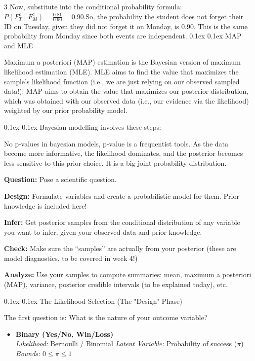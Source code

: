 \documentclass[8pt,landscape]{article}
\makeatletter
\renewcommand{\section}{\@startsection{section}{2}{0pt}%
    {0.1ex}%
    {0.1ex}%
    {\fontsize{8}{9}\bfseries\color{red}}} %
\renewcommand{\subsection}{\@startsection{subsection}{2}{0pt}%
    {0.1ex}%
    {0.1ex}%
    {\fontsize{8}{9}\bfseries\color{blue}}} %
\newcommand{\smalltext}[1]{
  {\fontsize{8}{9}\selectfont\sloppy #1\par}
}
\makeatother
\begin{document}
\begin{multicols}{3}
{  Now, substitute into the conditional probability formula:$P(F_T^c \mid F_M^c) = \frac{0.81}{0.90} = 0.90.$So, the probability the student does not forget their ID on Tuesday, given they did not forget it on Monday, is $0.90$. This is the same probability from Monday since both events are independent.
}
\subsection{MAP and MLE}
\smalltext{
  Maximum a posteriori (MAP) estimation is the Bayesian version of maximum likelihood estimation (MLE).
  MLE aims to find the value that maximizes the sample’s likelihood function (i.e., we are just relying on our observed sampled data!).
  MAP aims to obtain the value that maximizes our posterior distribution, which was obtained with our observed data (i.e., our evidence via the likelihood) weighted by our prior probability model.
}

\section{Bayesian modelling involves these steps:}
\smalltext{

  No p-values in bayesian models, p-value is a frequentist tools.
  As the data become more informative, the likelihood dominates, and the posterior becomes less sensitive to this prior choice.
  It is a big joint probability distribution.

  \textbf{Question:} Pose a scientific question.

  \textbf{Design:} Formulate variables and create a probabilistic model for them. Prior knowledge is included here!

  \textbf{Infer:} Get posterior samples from the conditional distribution of any variable you want to infer, given your observed data and prior knowledge.

  \textbf{Check:} Make sure the “samples” are actually from your posterior (these are model diagnostics, to be covered in week 4!)

  \textbf{Analyze:} Use your samples to compute summaries: mean, maximum a posteriori (MAP), variance, posterior credible intervals (to be explained today), etc.
}

\subsection{The Likelihood Selection (The "Design" Phase)}
\smalltext{
  The first question is: What is the nature of your outcome variable? 
}
\begin{itemize}
  \item \textbf{Binary (Yes/No, Win/Loss)} 
  \\ 
  \textit{Likelihood:} Bernoulli / Binomial 
  \textit{Latent Variable:} Probability of success ($\pi$)
  \textit{Bounds:} $0 \le \pi \le 1$
  

\end{itemize}
\end{multicols}
\end{document}
